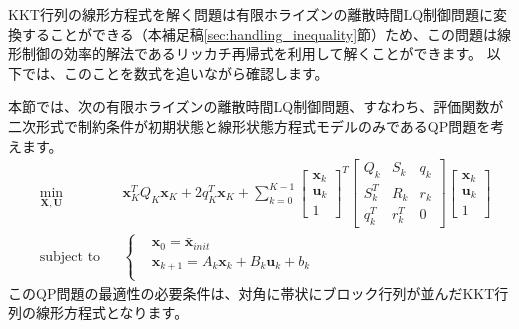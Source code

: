 \documentclass[a4paper]{jarticle}
\begin{document}
KKT行列の線形方程式を解く問題は有限ホライズンの離散時間LQ制御問題に変換することができる（本補足稿\ref{sec:handling_inequality}節）ため、この問題は線形制御の効率的解法であるリッカチ再帰式を利用して解くことができます\cite{rao1998application,boyd2004convex,frison2015algorithms}。
以下では、このことを数式を追いながら確認します。

本節では、次の有限ホライズンの離散時間LQ制御問題、すなわち、評価関数が二次形式で制約条件が初期状態と線形状態方程式モデルのみであるQP問題を考えます。
\begin{equation*}
\begin{aligned}
& \underset{ \mathbf{X},\mathbf{U}}{\text{min}} && 
\mathbf{x}_K^TQ_K\mathbf{x}_K + 2 q_K^T\mathbf{x}_K
+
\sum_{k=0}^{K-1}
\begin{bmatrix} \mathbf{x}_k \\ \mathbf{u}_k \\ 1\end{bmatrix}^T
\begin{bmatrix} Q_k & S_k & q_k \\ S_k^T & R_k & r_k \\ q_k^T & r_k^T & 0\end{bmatrix}
\begin{bmatrix} \mathbf{x}_k \\ \mathbf{u}_k \\ 1\end{bmatrix} \\
&\text{subject to} && \left \{
\begin{aligned}
    & \mathbf{x}_0 = \bar{\mathbf{x}}_{init}\\
    & \mathbf{x}_{k+1} = A_k \mathbf{x}_k + B_k \mathbf{u}_k + b_k\\
\end{aligned}
\right .
\end{aligned}
\end{equation*}
このQP問題の最適性の必要条件は、対角に帯状にブロック行列が並んだKKT行列の線形方程式となります。
\end{document}
